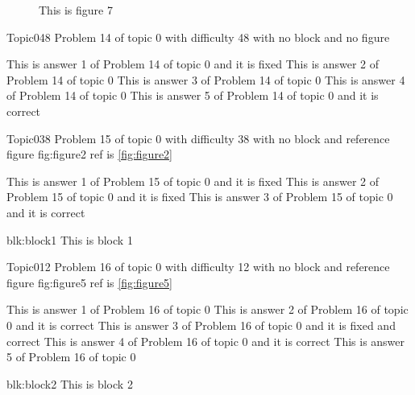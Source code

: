 \documentclass[master]{exam}
\begin{document}
\begin{figure}
	\begin{center}
		This is figure 7 
		\label{fig:figure7}
	\end{center}
\end{figure}

\begin{problem}{Topic0}{48}
	Problem 14 of topic 0 with difficulty 48 with no block and no figure
	\begin{answers}
		\answer[fixed] This is answer 1 of Problem 14 of topic 0 and it is fixed
		\answer This is answer 2 of Problem 14 of topic 0 
		\answer This is answer 3 of Problem 14 of topic 0 
		\answer This is answer 4 of Problem 14 of topic 0 
		\answer[correct] This is answer 5 of Problem 14 of topic 0 and it is correct
	\end{answers}
\end{problem}

\begin{problem}{Topic0}{38}
	Problem 15 of topic 0 with difficulty 38 with no block and reference figure fig:figure2 ref is \ref{fig:figure2}
	\begin{answers}
		\answer[fixed] This is answer 1 of Problem 15 of topic 0 and it is fixed
		\answer[fixed] This is answer 2 of Problem 15 of topic 0 and it is fixed
		\answer[correct] This is answer 3 of Problem 15 of topic 0 and it is correct
	\end{answers}
\end{problem}



\begin{block}{blk:block1}
This is block 1
\end{block}


\begin{problem}{Topic0}{12}
	Problem 16 of topic 0 with difficulty 12 with no block and reference figure fig:figure5 ref is \ref{fig:figure5}
	\begin{answers}
		\answer This is answer 1 of Problem 16 of topic 0 
		\answer[correct] This is answer 2 of Problem 16 of topic 0 and it is correct
		 This is answer 3 of Problem 16 of topic 0 and it is fixed and correct
		\answer[correct] This is answer 4 of Problem 16 of topic 0 and it is correct
		\answer This is answer 5 of Problem 16 of topic 0 
	\end{answers}
\end{problem}



\begin{block}{blk:block2}
This is block 2
\end{block}
\end{document}
